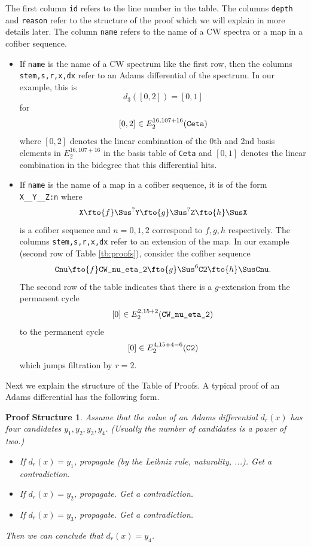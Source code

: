 \documentclass{amsart}
\numberwithin{equation}{section}
\newtheorem{proofstr}[theorem]{Proof Structure}
\begin{document}
The first column \verb|id| refers to the line number in the table. The columns \verb|depth| and \verb|reason| refer to the structure of the proof which we will explain in more details later. The column \verb|name| refers to the name of a CW spectra or a map in a cofiber sequence. 
\begin{itemize}
    \item If \verb|name| is the name of a CW spectrum like the first row, then the columns \verb|stem,s,r,x,dx| refer to an Adams differential of the spectrum. In our example, this is $$d_3([0,2])=[0,1]$$ for $$[0,2]\in E_2^{16,107+16}(\verb|Ceta|)$$ where $[0,2]$ denotes the linear combination of the 0th and 2nd basis elements in $E_2^{16,107+16}$ in the basis table of \verb|Ceta| and $[0,1]$ denotes the linear combination in the bidegree that this differential hits.
    \item If \verb|name| is the name of a map in a cofiber sequence, it is of the form \verb|X__Y__Z:n| where
    $$\verb|X|\fto{f} \Sus^?\verb|Y|\fto{g} \Sus^? \verb|Z|\fto{h} \Sus \verb|X|$$
    is a cofiber sequence and $n=0,1,2$ correspond to $f,g,h$ respectively. The columns \verb|stem,s,r,x,dx| refer to an extension of the map. In our example (second row of Table \ref{tb:proofs}), consider the cofiber sequence
    $$\verb|Cnu|\fto{f} \verb|CW_nu_eta_2|\fto{g} \Sus^{6}\verb|C2|\fto{h} \Sus \verb|Cnu|.$$
    The second row of the table indicates that there is a $g$-extension from the permanent cycle $$[0]\in E_2^{2,15+2}(\verb|CW_nu_eta_2|)$$ to the permanent cycle $$[0]\in E_2^{4,15+4-6}(\verb|C2|)$$
    which jumps filtration by $r=2$.
\end{itemize}

Next we explain the structure of the Table of Proofs. A typical proof of an Adams differential has the following form.

\begin{proofstr}\label{ps:e57cb438}
Assume that the value of an Adams differential $d_r(x)$ has four candidates $y_1,y_2,y_3,y_4$. (Usually the number of candidates is a power of two.)
\begin{itemize}
    \item If $d_r(x)=y_1$, propagate (by the Leibniz rule, naturality, ...). Get a contradiction.
    \item If $d_r(x)=y_2$, propagate. Get a contradiction.
    \item If $d_r(x)=y_3$, propagate. Get a contradiction.
\end{itemize}
Then we can conclude that $d_r(x)=y_4$.
\end{proofstr}
\end{document}
